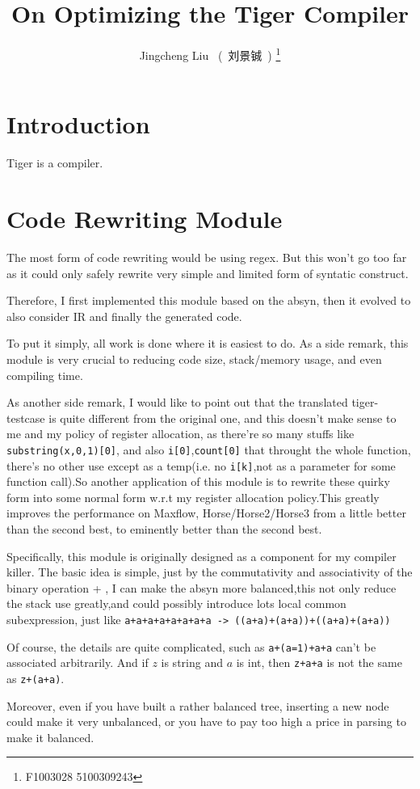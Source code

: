 \documentclass[a4paper]{article}
\author{Jingcheng Liu ~(~刘景铖~) \thanks{F1003028 5100309243 } }
\title{On Optimizing the Tiger Compiler}
\begin{document}
\maketitle
\section{Introduction}
Tiger is a compiler.
\section{Code Rewriting Module}
The most form of code rewriting would be using regex.
But this won't go too far as it could only safely rewrite
very simple and limited form of syntatic construct.

Therefore, I first implemented this module based on the absyn,
then it evolved to also consider IR and finally the generated code.

To put it simply, all work is done where it is easiest to do.
As a side remark, this module is very crucial to reducing code size, stack/memory usage, and
even compiling time.

As another side remark, I would like to point out that the translated tiger-testcase is quite
different from the original one, and this doesn't make sense to me and my policy of register
allocation, as there're so many stuffs like \verb|substring(x,0,1)[0]|, and also \verb|i[0]|,\verb|count[0]|
that throught the whole function, there's no other use except as a temp(i.e. no \verb|i[k]|,not as a parameter
for some function call).So another application of this module is to rewrite these quirky form into some normal
form w.r.t my register allocation policy.This greatly improves the performance on Maxflow, Horse/Horse2/Horse3
from a little better than the second best, to eminently better than the second best.

Specifically, this module is originally designed as a component for my compiler killer.
The basic idea is simple, just by the commutativity and associativity of the binary operation + , 
I can make the absyn more balanced,this not only reduce the stack use greatly,and could possibly
introduce lots local common subexpression, just like \verb|a+a+a+a+a+a+a+a -> ((a+a)+(a+a))+((a+a)+(a+a))|

Of course, the details are quite complicated, such as \verb|a+(a=1)+a+a| can't be associated arbitrarily.
And if $z$ is string and $a$ is int, then \verb|z+a+a| is not the same as \verb|z+(a+a)|.

Moreover, even if you have built a rather balanced tree, inserting a new node could make it very unbalanced,
or you have to pay too high a price in parsing to make it balanced.
\end{document}
